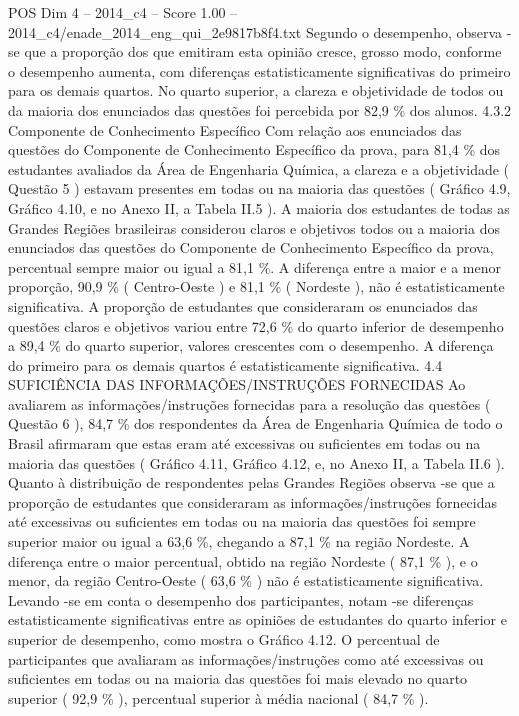 \begin{textsample}{POS Dim 4 – 2014\_c4 – Score 1.00 – 2014\_c4/enade\_2014\_eng\_qui\_2e9817b8f4.txt}
Segundo o desempenho, observa -se que a proporção dos que emitiram esta opinião cresce, grosso modo, conforme o desempenho aumenta, com diferenças estatisticamente significativas do primeiro para os demais quartos.
No quarto superior, a clareza e objetividade de todos ou da maioria dos enunciados das questões foi percebida por 82,9 \% dos alunos. 4.3.2 Componente de Conhecimento Específico Com relação aos enunciados das questões do Componente de Conhecimento Específico da prova, para 81,4 \% dos estudantes avaliados da Área de Engenharia Química, a clareza e a objetividade ( Questão 5 ) estavam presentes em todas ou na maioria das questões ( Gráfico 4.9, Gráfico 4.10, e no Anexo II, a Tabela II.5 ).
A maioria dos estudantes de todas as Grandes Regiões brasileiras considerou claros e objetivos todos ou a maioria dos enunciados das questões do Componente de Conhecimento Específico da prova, percentual sempre maior ou igual a 81,1 \%.
A diferença entre a maior e a menor proporção, 90,9 \% ( Centro-Oeste ) e 81,1 \% ( Nordeste ), não é estatisticamente significativa.
A proporção de estudantes que consideraram os enunciados das questões claros e objetivos variou entre 72,6 \% do quarto inferior de desempenho a 89,4 \% do quarto superior, valores crescentes com o desempenho.
A diferença do primeiro para os demais quartos é estatisticamente significativa. 4.4 SUFICIÊNCIA DAS INFORMAÇÕES/INSTRUÇÕES FORNECIDAS Ao avaliarem as informações/instruções fornecidas para a resolução das questões ( Questão 6 ), 84,7 \% dos respondentes da Área de Engenharia Química de todo o Brasil afirmaram que estas eram até excessivas ou suficientes em todas ou na maioria das questões ( Gráfico 4.11, Gráfico 4.12, e, no Anexo II, a Tabela II.6 ).
Quanto à distribuição de respondentes pelas Grandes Regiões observa -se que a proporção de estudantes que consideraram as informações/instruções fornecidas até excessivas ou suficientes em todas ou na maioria das questões foi sempre superior maior ou igual a 63,6 \%, chegando a 87,1 \% na região Nordeste.
A diferença entre o maior percentual, obtido na região Nordeste ( 87,1 \% ), e o menor, da região Centro-Oeste ( 63,6 \% ) não é estatisticamente significativa.
Levando -se em conta o desempenho dos participantes, notam -se diferenças estatisticamente significativas entre as opiniões de estudantes do quarto inferior e superior de desempenho, como mostra o Gráfico 4.12.
O percentual de participantes que avaliaram as informações/instruções como até excessivas ou suficientes em todas ou na maioria das questões foi mais elevado no quarto superior ( 92,9 \% ), percentual superior à média nacional ( 84,7 \% ).

\end{textsample}
